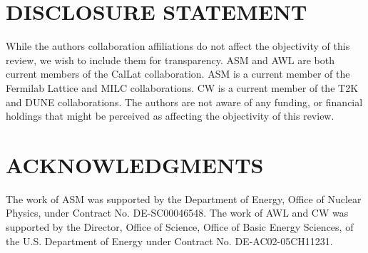 \documentclass{ar-1col}
\begin{document}
\section*{DISCLOSURE STATEMENT}
While the authors collaboration affiliations do not affect the objectivity of this review, we wish to include them for transparency. ASM and AWL are both current members of the CalLat collaboration. ASM is a current member of the Fermilab Lattice and MILC collaborations. CW is a current member of the T2K and DUNE collaborations.
The authors are not aware of any funding, or financial holdings that might be perceived as affecting the objectivity of this review.

\section*{ACKNOWLEDGMENTS}
The work of ASM was supported by the Department of Energy, Office of Nuclear Physics, under Contract No. DE-SC00046548.
The work of AWL and CW was supported by the Director, Office of Science, Office of Basic Energy Sciences, of the U.S. Department of Energy under Contract No. DE-AC02-05CH11231.




\end{document}
